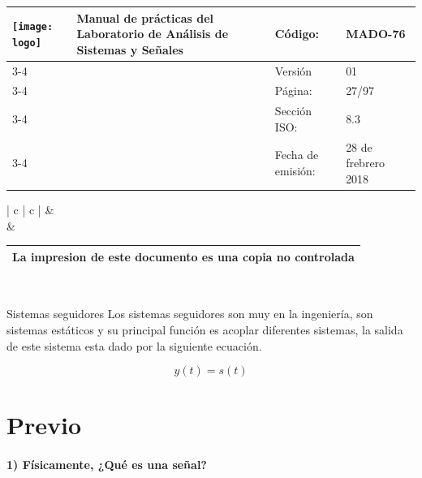 
\centering
\begin{tabular}{ |	p{30 mm}|	p{61 mm}	|	p{33mm}	| p{43mm}	| } 
	\hline
	\multirow{4}{30mm}{\centering \texttt{[image: logo]}} &
	\multirow{4}{61mm}{\centering \textbf{ \textbf{Manual de prácticas del Laboratorio de Análisis de Sistemas y Señales}}}    & Código: & MADO-76 \\
	\cline{3-4}
	& &  Versión & 01 \\
	\cline{3-4}
	& & Página: & 27/97 \\ \cline{3-4}
	& & Sección ISO: & 8.3 \\ \cline{3-4}
	& & Fecha de emisión: & 28 de frebrero 2018 \\
	\hline
\end{tabular}
\begin{tabular}{ |	c |	c	| } 
	 &
	   \\
	& \\ \hline
\end{tabular}
\begin{tabular}{|p{180mm}|}
	\multirow{1}{180mm}{ \centering La impresion de este documento es una copia no controlada }  \\ \hline \end{tabular} \\
\vspace{1cm}

\noindent \justifying


Sistemas seguidores
Los sistemas seguidores son muy en la ingeniería, son sistemas estáticos y su principal función es acoplar
diferentes sistemas, la salida de este sistema esta dado por la siguiente ecuación.

\setcounter{equation}{9}

\begin{equation}
	y(t)=s(t)
\end{equation}


\section{Previo}

\setlength{\parindent}{25pt}

\paragraph{1) Físicamente, ¿Qué es una señal?}


